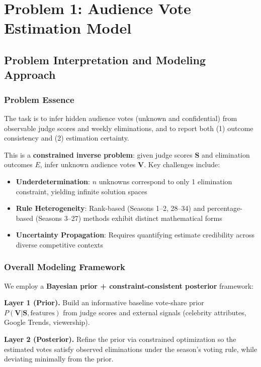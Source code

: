 
\section{Problem 1: Audience Vote Estimation Model}

\subsection{Problem Interpretation and Modeling Approach}

\subsubsection{Problem Essence}

The task is to infer hidden audience votes (unknown and confidential) from observable judge scores and weekly eliminations, and to report both (1) outcome consistency and (2) estimation certainty.

This is a \textbf{constrained inverse problem}: given judge scores $\mathbf{S}$ and elimination outcomes $E$, infer unknown audience votes $\mathbf{V}$. Key challenges include:
\begin{itemize}
    \item \textbf{Underdetermination}: $n$ unknowns correspond to only 1 elimination constraint, yielding infinite solution spaces
    \item \textbf{Rule Heterogeneity}: Rank-based (Seasons 1--2, 28--34) and percentage-based (Seasons 3--27) methods exhibit distinct mathematical forms
    \item \textbf{Uncertainty Propagation}: Requires quantifying estimate credibility across diverse competitive contexts
\end{itemize}

\subsubsection{Overall Modeling Framework}

We employ a \textbf{Bayesian prior + constraint-consistent posterior} framework:

\textbf{Layer 1 (Prior).} Build an informative baseline vote-share prior $P(\mathbf{V}|\mathbf{S},\text{features})$ from judge scores and external signals (celebrity attributes, Google Trends, viewership).

\textbf{Layer 2 (Posterior).} Refine the prior via constrained optimization so the estimated votes satisfy observed eliminations under the season's voting rule, while deviating minimally from the prior.

